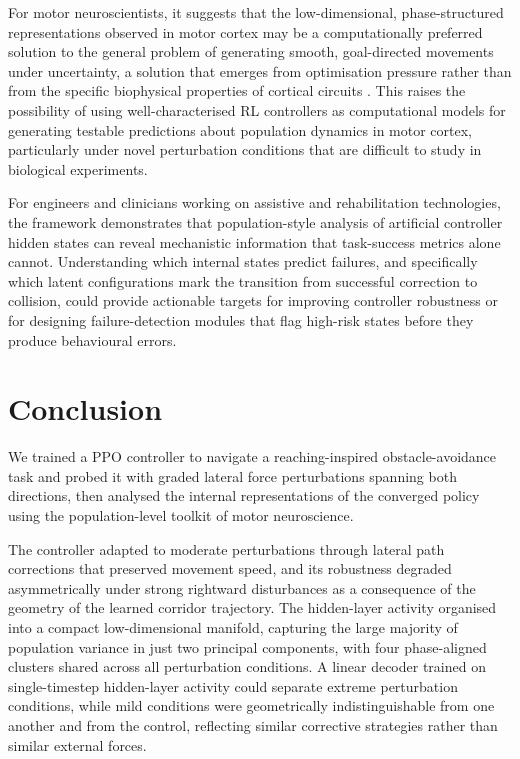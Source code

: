 \documentclass{article}
\begin{document}
For motor neuroscientists, it suggests that the low-dimensional, phase-structured
representations observed in motor cortex may be a computationally preferred
solution to the general problem of generating smooth, goal-directed
movements under uncertainty, a solution that emerges from optimisation
pressure rather than from the specific biophysical properties of cortical
circuits \citep{Franklin2011,WolpertGhahramani2000,Rizzolatti2001,Berniker2011}.
This raises the possibility of using well-characterised RL controllers
as computational models for generating testable predictions about
population dynamics in motor cortex, particularly under novel perturbation
conditions that are difficult to study in biological experiments.

For engineers and clinicians working on assistive and rehabilitation
technologies, the framework demonstrates that population-style analysis
of artificial controller hidden states can reveal mechanistic information
that task-success metrics alone cannot.
Understanding which internal states predict failures, and specifically
which latent configurations mark the transition from successful correction
to collision, could provide actionable targets for
improving controller robustness or for designing failure-detection modules
that flag high-risk states before they produce behavioural errors.

\section{Conclusion}

We trained a PPO controller to navigate a reaching-inspired
obstacle-avoidance task and probed it with graded lateral force
perturbations spanning both directions, then analysed the internal
representations of the converged policy using the population-level
toolkit of motor neuroscience.

The controller adapted to moderate perturbations through lateral path
corrections that preserved movement speed, and its robustness degraded
asymmetrically under strong rightward disturbances as a consequence of
the geometry of the learned corridor trajectory.
The hidden-layer activity organised into a compact low-dimensional manifold,
capturing the large majority of population variance in just two principal
components, with four phase-aligned clusters shared across all perturbation
conditions.
A linear decoder trained on single-timestep hidden-layer activity could
separate extreme perturbation conditions, while mild conditions were
geometrically indistinguishable from one another and from the control,
reflecting similar corrective strategies rather than similar external
forces.
\end{document}
